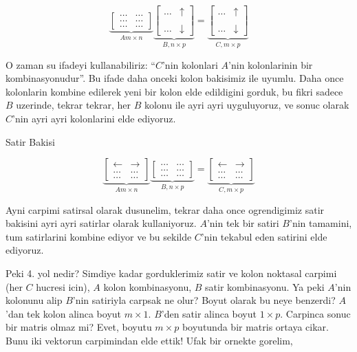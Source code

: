 \documentclass[12pt,fleqn]{article}\usepackage{../common}
\begin{document}
$$ 
\underbrace{
\left[\begin{array}{rr}
\dots & \dots   \\
\dots & \dots   \\
\dots & \dots 
\end{array}\right]
}_{A m \times n}
\underbrace{
\left[\begin{array}{rr}
\dots & \uparrow \\
& \\
\dots & \downarrow
\end{array}\right] 
}_{B, n \times p}
=
\underbrace{
\left[\begin{array}{rr}
\dots & \uparrow \\
& \\
\dots & \downarrow
\end{array}\right] 
}_{C, m \times p}
$$

O zaman su ifadeyi kullanabiliriz: ``$C$'nin kolonlari $A$'nin kolonlarinin
bir kombinasyonudur''. Bu ifade daha onceki kolon bakisimiz ile
uyumlu. Daha once kolonlarin kombine edilerek yeni bir kolon elde
edildigini gorduk, bu fikri sadece $B$ uzerinde, tekrar tekrar, her $B$
kolonu ile ayri ayri uyguluyoruz, ve sonuc olarak $C$'nin ayri ayri
kolonlarini elde ediyoruz.

Satir Bakisi

$$ 
\underbrace{
\left[\begin{array}{rr}
\leftarrow  & \rightarrow  \\
\dots & \dots \\
\dots & \dots 
\end{array}\right]
}_{A m \times n}
\underbrace{
\left[\begin{array}{rr}
\dots & \dots \\
\dots & \dots \\
\dots & \dots
\end{array}\right] 
}_{B, n \times p}
=
\underbrace{
\left[\begin{array}{rr}
\leftarrow  & \rightarrow  \\
\dots & \dots  \\
\dots & \dots 
\end{array}\right] 
}_{C, m \times p}
$$

Ayni carpimi satirsal olarak dusunelim, tekrar daha once ogrendigimiz satir
bakisini ayri ayri satirlar olarak kullaniyoruz. $A$'nin tek bir satiri
$B$'nin tamamini, tum satirlarini kombine ediyor ve bu sekilde $C$'nin
tekabul eden satirini elde ediyoruz. 

Peki 4. yol nedir? Simdiye kadar gorduklerimiz satir ve kolon noktasal
carpimi (her $C$ hucresi icin), $A$ kolon kombinasyonu, $B$ satir
kombinasyonu. Ya peki $A$'nin kolonunu alip $B$'nin satiriyla carpsak ne
olur? Boyut olarak bu neye benzerdi? $A$'dan tek kolon alinca boyut $m
\times 1$. $B$'den satir alinca boyut $1 \times p$. Carpinca sonuc bir
matris olmaz mi? Evet, boyutu $m \times p$ boyutunda bir matris ortaya
cikar. Bunu iki vektorun carpimindan elde ettik! Ufak bir ornekte gorelim, 
\end{document}
